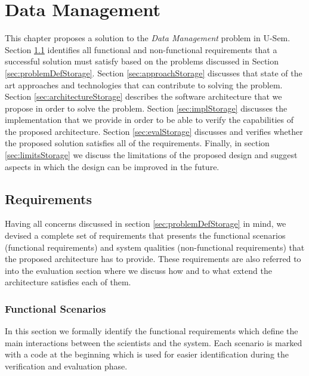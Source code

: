 \chapter{Data Management} 
\label{cha:data}

This chapter proposes a solution to the \textit{Data Management} problem in U-Sem. Section \ref{sec:storageReq} identifies all functional and non-functional requirements that a successful solution must satisfy based on the problems discussed in Section \ref{sec:problemDefStorage}. Section \ref{sec:approachStorage} discusses that state of the art approaches and technologies that  can contribute to solving the problem. Section \ref{sec:architectureStorage} describes the software architecture that we propose in order to solve the problem. Section \ref{sec:implStorage} discusses the implementation that we provide in order to be able to verify the capabilities of the proposed architecture. Section \ref{sec:evalStorage} discusses and verifies whether the proposed solution satisfies all of the requirements. Finally, in section \ref{sec:limitsStorage} we discuss the limitations of the proposed design and suggest aspects in which the design can be improved in the future.

\section{Requirements}
\label{sec:storageReq}

Having all concerns discussed in section \ref{sec:problemDefStorage} in mind, we devised a complete set of requirements that presents the functional scenarios (functional requirements) and system qualities (non-functional requirements) that the proposed architecture has to provide. These requirements are also referred to into the evaluation section where we discuss how and to what extend the architecture satisfies each of them.

\subsection{Functional Scenarios}
In this section we formally identify the functional requirements which define the main interactions between the scientists and the system. Each scenario is marked with a code at the beginning which is used for easier identification during the verification and evaluation phase.

